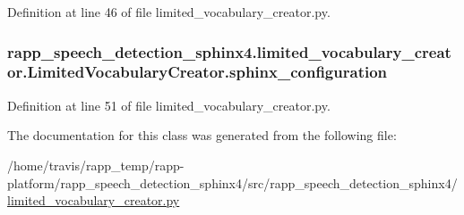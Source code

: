 Definition at line 46 of file limited\-\_\-vocabulary\-\_\-creator.\-py.

\hypertarget{classrapp__speech__detection__sphinx4_1_1limited__vocabulary__creator_1_1LimitedVocabularyCreator_a7ddf95a2e0ec8488cf1677f8d68e0846}{
\subsubsection[{sphinx\-\_\-configuration}]{\setlength{\rightskip}{0pt plus 5cm}rapp\-\_\-speech\-\_\-detection\-\_\-sphinx4.\-limited\-\_\-vocabulary\-\_\-creator.\-Limited\-Vocabulary\-Creator.\-sphinx\-\_\-configuration}}\label{classrapp__speech__detection__sphinx4_1_1limited__vocabulary__creator_1_1LimitedVocabularyCreator_a7ddf95a2e0ec8488cf1677f8d68e0846}


Definition at line 51 of file limited\-\_\-vocabulary\-\_\-creator.\-py.



The documentation for this class was generated from the following file\-:\begin{DoxyCompactItemize}
\item 
/home/travis/rapp\-\_\-temp/rapp-\/platform/rapp\-\_\-speech\-\_\-detection\-\_\-sphinx4/src/rapp\-\_\-speech\-\_\-detection\-\_\-sphinx4/\hyperlink{limited__vocabulary__creator_8py}{limited\-\_\-vocabulary\-\_\-creator.\-py}\end{DoxyCompactItemize}
